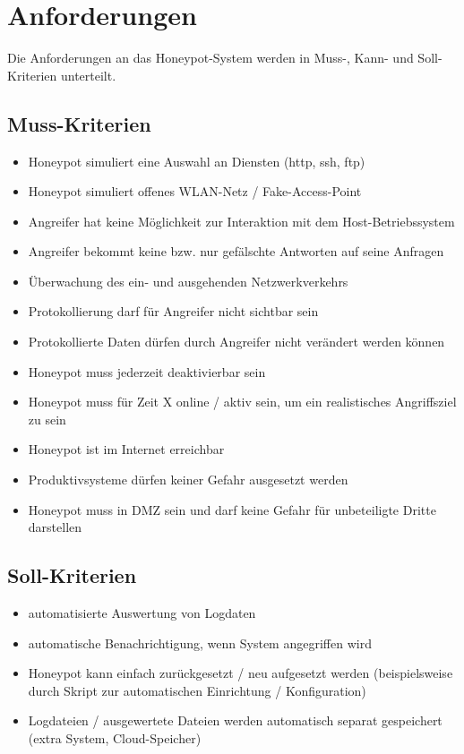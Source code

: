 \chapter{Anforderungen}
\label{sec:Anforderungen}

Die Anforderungen an das Honeypot-System werden in Muss-, Kann- und Soll-Kriterien unterteilt.


\section{Muss-Kriterien}
\label{subsec:Muss-Kriterien}
\begin{itemize}
\item Honeypot simuliert eine Auswahl an Diensten (http, ssh, ftp)
\item Honeypot simuliert offenes WLAN-Netz / Fake-Access-Point
\item Angreifer hat keine Möglichkeit zur Interaktion mit dem Host-Betriebssystem
\item Angreifer bekommt keine bzw. nur gefälschte Antworten auf seine Anfragen
\item Überwachung des ein- und ausgehenden Netzwerkverkehrs
\item Protokollierung darf für Angreifer nicht sichtbar sein
\item Protokollierte Daten dürfen durch Angreifer nicht verändert werden können
\item Honeypot muss jederzeit deaktivierbar sein
\item Honeypot muss für Zeit X online / aktiv sein, um ein realistisches Angriffsziel zu sein
\item Honeypot ist im Internet erreichbar
\item Produktivsysteme dürfen keiner Gefahr ausgesetzt werden
\item Honeypot muss in DMZ sein und darf keine Gefahr für unbeteiligte Dritte darstellen
\end{itemize}

\newpage

\section{Soll-Kriterien}
\label{subsec:Soll-Kriterien}
\begin{itemize}
\item automatisierte Auswertung von Logdaten
\item automatische Benachrichtigung, wenn System angegriffen wird
\item Honeypot kann einfach zurückgesetzt / neu aufgesetzt werden (beispielsweise durch Skript zur automatischen Einrichtung / Konfiguration)
\item Logdateien / ausgewertete Dateien werden automatisch separat gespeichert (extra System, Cloud-Speicher)
\end{itemize}


